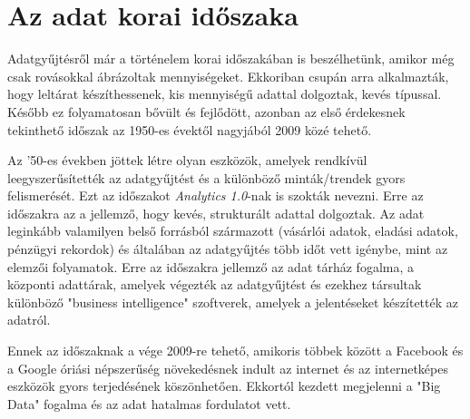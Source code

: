 \section{Az adat korai időszaka}

Adatgyűjtésről már a történelem korai időszakában is beszélhetünk, amikor még csak rovásokkal ábrázoltak mennyiségeket. Ekkoriban csupán arra alkalmazták, hogy leltárat készíthessenek, kis mennyiségű adattal dolgoztak, kevés típussal. Később ez folyamatosan bővült és fejlődött, azonban az első érdekesnek tekinthető időszak az 1950-es évektől nagyjából 2009 közé tehető.

Az '50-es években jöttek létre olyan eszközök, amelyek rendkívül leegyszerűsítették az adatgyűjtést és a különböző minták/trendek gyors felismerését. Ezt az időszakot \textit{Analytics 1.0}-nak is szokták nevezni. Erre az időszakra az a jellemző, hogy kevés, strukturált adattal dolgoztak. Az adat leginkább valamilyen belső forrásból származott (vásárlói adatok, eladási adatok, pénzügyi rekordok) és általában az adatgyűjtés több időt vett igénybe, mint az elemzői folyamatok. Erre az időszakra jellemző az adat tárház fogalma, a központi adattárak, amelyek végezték az adatgyűjtést és ezekhez társultak különböző "business intelligence" szoftverek, amelyek a jelentéseket készítették az adatról.

Ennek az időszaknak a vége 2009-re tehető, amikoris többek között a Facebook és a Google óriási népszerűség növekedésnek indult az internet és az internetképes eszközök gyors terjedésének köszönhetően. Ekkortól kezdett megjelenni a "Big Data" fogalma és az adat hatalmas fordulatot vett.